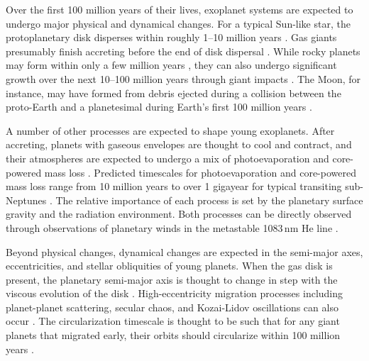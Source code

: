 \documentclass[12pt,twocolumn,tighten]{aastex63}
\begin{document}
Over the first 100 million years of their lives, exoplanet systems are
expected to undergo major physical and dynamical changes.  For a
typical Sun-like star, the protoplanetary disk disperses within
roughly 1--10 million years
\citep{mamajek_initial_2009,fedele_timescale_2010,dullemond_inner_2010,williams_protoplanetary_2011}.
Gas giants presumably finish accreting before the end of disk
dispersal \citep{pollack_formation_1996}.  While rocky planets may
form within only a few million years \citep{dauphas_hf-w-th_2011},
they can also undergo significant growth over the next 10--100 million
years through giant impacts \citep[{\it
e.g.},][]{kleine_hf-w_2009,konig_earths_2011,morbidelli_building_2012,raymond_terrestrial_2014}.
The Moon, for instance, may have formed from debris ejected during a
collision between the proto-Earth and a planetesimal during Earth's
first 100 million years
\citep{cameron_origin_1976,canup_origin_2001,touboul_late_2007}.

A number of other processes are expected to shape young exoplanets.
After accreting, planets with gaseous envelopes are thought to cool
and contract, and their atmospheres are expected to undergo a mix of
photoevaporation and core-powered mass loss \citep[{\it
e.g.},][]{Fortney_et_al_2007,Owen_Wu_2013,Fulton_et_al_2017,gupta_sculpting_2019,gupta_signatures_2020}.
Predicted timescales for photoevaporation and core-powered mass loss
range from 10 million years to over 1 gigayear for typical transiting
sub-Neptunes
\citep{ginzburg_superearth_2016,owen_evaporation_2017,king_euv_2020}.
The relative importance of each process is set by the planetary
surface gravity and the radiation environment.  Both processes can be
directly observed through observations of planetary winds in the
metastable 1083$\,$nm He line
\citep{spake_helium_2018,oklopcic_new_2018,mansfield_detection_2018}.

Beyond physical changes, dynamical changes are expected in the
semi-major axes, eccentricities, and stellar obliquities of young
planets.  When the gas disk is present, the planetary semi-major axis
is thought to change in step with the viscous evolution of the disk
\citep{lin_orbital_1996}.  High-eccentricity migration processes
including planet-planet scattering, secular chaos, and Kozai-Lidov
oscillations can also occur \citep[{\it
e.g.},][]{fabrycky_shrinking_2007,chatterjee_dynamical_2008,lithwick_secular_2014}.
The circularization timescale is thought to be such that for any giant
planets that migrated early, their orbits should circularize within
100 million years \citep{zahn_tidal_1977,bonomo_gaps_2017}.
\end{document}
